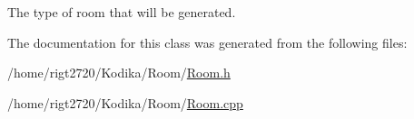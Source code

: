 The type of room that will be generated. 



The documentation for this class was generated from the following files\-:\begin{DoxyCompactItemize}
\item 
/home/rigt2720/\-Kodika/\-Room/\hyperlink{Room_8h}{Room.\-h}\item 
/home/rigt2720/\-Kodika/\-Room/\hyperlink{Room_8cpp}{Room.\-cpp}\end{DoxyCompactItemize}
